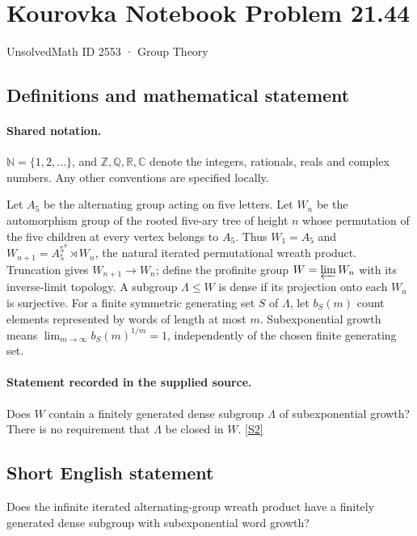 \documentclass[11pt]{article}
\newcommand{\sref}[2]{\hyperlink{source:#1:#2}{[S#2]}}
\begin{document}
\setcounter{section}{2552}
\section{Kourovka Notebook Problem 21.44}\label{2553}
{\small\sffamily UnsolvedMath ID 2553 · Group Theory}
\subsection{Definitions and mathematical statement}

\paragraph{Shared notation.}$\mathbb N=\{1,2,\ldots\}$, and $\mathbb Z,\mathbb Q,\mathbb R,\mathbb C$ denote the integers, rationals, reals and complex numbers. Any other conventions are specified locally.


Let $A_5$ be the alternating group acting on five letters. Let $W_n$ be the automorphism group of the rooted five-ary tree of height $n$ whose permutation of the five children at every vertex belongs to $A_5$. Thus $W_1=A_5$ and $W_{n+1}=A_5^{5^n}\rtimes W_n$, the natural iterated permutational wreath product. Truncation gives $W_{n+1}\to W_n$; define the profinite group $W=\varprojlim W_n$ with its inverse-limit topology. A subgroup $\Lambda\leq W$ is dense if its projection onto each $W_n$ is surjective. For a finite symmetric generating set $S$ of $\Lambda$, let $b_S(m)$ count elements represented by words of length at most $m$. Subexponential growth means $\lim_{m\to\infty}b_S(m)^{1/m}=1$, independently of the chosen finite generating set.
\paragraph{Statement recorded in the supplied source.}
Does $W$ contain a finitely generated dense subgroup $\Lambda$ of subexponential growth? There is no requirement that $\Lambda$ be closed in $W$. \sref{2553}{2}
\subsection{Short English statement}
Does the infinite iterated alternating-group wreath product have a finitely generated dense subgroup with subexponential word growth?
\end{document}
